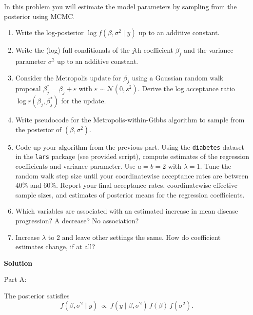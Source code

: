 \documentclass[hidelinks]{article}
\begin{document}
\noindent In this problem you will estimate the model parameters by sampling from 
the posterior using MCMC.

\begin{enumerate}
    \item[(a)] Write the log-posterior $\log f(\beta, \sigma^2 \mid y)$ 
    up to an additive constant.
    
    \item[(b)] Write the (log) full conditionals of the $j$th coefficient 
    $\beta_j$ and the variance parameter $\sigma^2$ up to an additive constant.
    
    \item[(c)] Consider the Metropolis update for $\beta_j$ using a Gaussian 
    random walk proposal $\beta_j^* = \beta_j + \varepsilon$ with 
    $\varepsilon \sim \mathcal{N}(0,s^2)$. Derive the log acceptance ratio 
    $\log r(\beta_j, \beta_j^*)$ for the update.
    
    \item[(d)] Write pseudocode for the Metropolis-within-Gibbs algorithm 
    to sample from the posterior of $(\beta, \sigma^2)$.
    
    \item[(e)] Code up your algorithm from the previous part. Using the 
    \texttt{diabetes} dataset in the \texttt{lars} package (see provided script), 
    compute estimates of the regression coefficients and variance parameter. 
    Use $a = b = 2$ with $\lambda = 1$. Tune the random walk step size 
    until your coordinatewise acceptance rates are between 40\% and 60\%. 
    Report your final acceptance rates, coordinatewise effective sample sizes, 
    and estimates of posterior means for the regression coefficients.
    
    \item[(f)] Which variables are associated with an estimated increase in mean 
    disease progression? A decrease? No association?
    
    \item[(g)] Increase $\lambda$ to 2 and leave other settings the same. 
    How do coefficient estimates change, if at all?
\end{enumerate}

\noindent \textbf{Solution}

\noindent Part A:

\noindent The posterior satisfies
\[
f(\beta,\sigma^2\mid y)\ \propto\ f(y\mid \beta,\sigma^2)\,f(\beta)\,f(\sigma^2).
\]
\end{document}
